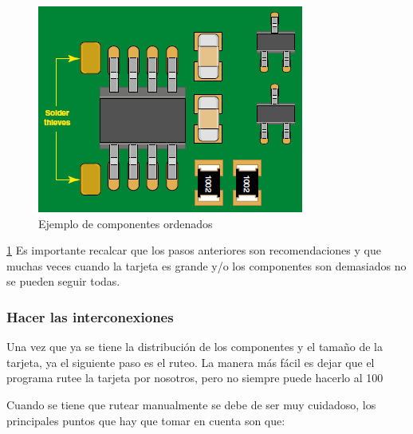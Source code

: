 \begin{figure}
\includegraphics[scale=0.6,angle=0]{img/OrdenComponentes.png}\caption{Ejemplo de componentes ordenados}
\label{Flo:OrdenComponentes}
\end{figure}

\ref{Flo:OrdenComponentes}
Es importante recalcar que los pasos anteriores son recomendaciones y que muchas veces cuando la tarjeta es grande y/o los componentes son demasiados no se pueden seguir todas.

\subsubsection*{Hacer las interconexiones}

Una vez que ya se tiene la distribución de los componentes y el tamaño de la tarjeta, ya el siguiente paso es el ruteo. La manera más fácil es dejar que el programa rutee la tarjeta por nosotros, pero no siempre puede hacerlo al 100%

Cuando se tiene que rutear manualmente se debe de ser muy cuidadoso, los principales puntos que hay que tomar en cuenta son que:

